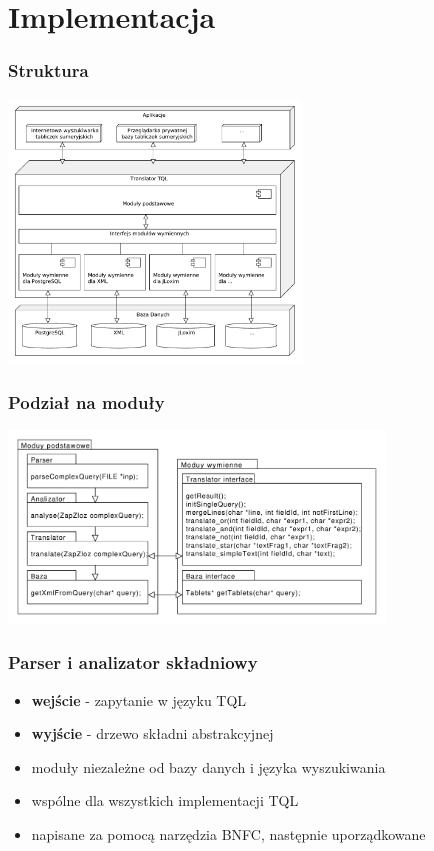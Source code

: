 \section{Implementacja}
\begin{frame}
     \frametitle{Struktura}
\begin{center}
\includegraphics[height=70mm]{../diagramy/struktura.pdf}
\end{center}
\end{frame}


\begin{frame}
     \frametitle{Podział na moduły}
    
\begin{center}
\includegraphics[width=100mm]{../diagramy/pakiety.pdf}
\end{center}
\end{frame}

\begin{frame}
\frametitle{Parser i analizator składniowy}
\begin{itemize}
\item \textbf{wejście} - zapytanie w języku TQL
\item \textbf{wyjście} - drzewo składni abstrakcyjnej
\item moduły niezależne od bazy danych i języka wyszukiwania
\item wspólne dla wszystkich implementacji TQL
\item napisane za pomocą narzędzia BNFC, następnie uporządkowane

\end{itemize}
\end{frame}

